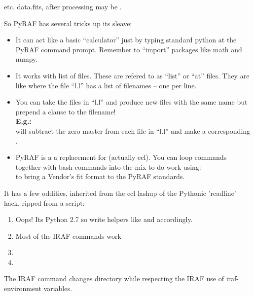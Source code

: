 etc. data.fits, after processing may be .

So PyRAF has several tricks up its sleave:
\begin{itemize}
\addtolength{\itemsep}{-0.5\baselineskip}
   \item   It can act like a basic ``calculator'' just by typing standard python at the
PyRAF command prompt. Remember to ``import'' packages like math and numpy.
   \item It works with list of files. These are refered to as ``list''
     or ``at'' files. They are like {\color{verbcolor}{\verb#@l.l#}}
     where the file ``l.l'' has a list of filenames -- one per line.
   \item You can take the files in ``l.l'' and produce new files with
     the same name but prepend a clause to the
     filename!\\ \textbf{E.g.:}
     {\color{verbcolor}{\verb#imarith @l.l - zmaster.fits z_@l.l#}}\\ will
     subtract the zero master from each file in ``l.l'' and make a
     corresponding {\color{verbcolor}{\verb#z_filename.fits#}}.
\item PyRAF is a a replacement for {\color{verbcolor}{\verb#cl#}} (actually
ecl). You can loop {\color{verbcolor}{\verb#.cl#}} commands together
with bash commands into the mix to do work using:\\
{\color{verbcolor}{\verb#cl < ~/iraf/fit2fits.cl#}} to bring a Vendor's
fit format to the PyRAF standards.
\end{itemize}

It has a few oddities, inherited from the ecl lashup of the Pythonic 'readline' hack,
ripped from a  script:

\vspace{-.15cm}
\begin{enumerate}\addtolength{\itemsep}{-0.5\baselineskip}
   \item Oops! Its Python 2.7 so write helpers like  and
      accordingly.
   \item   Most of the IRAF  commands work
   \item   {}
   \item   {}
\end{enumerate}

The IRAF command   changes directory while respecting
the IRAF use of iraf-environment variables.

